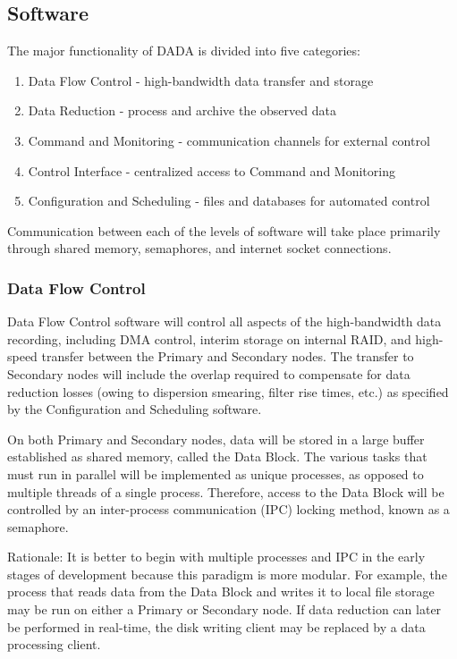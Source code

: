 \subsection{Software}

The major functionality of DADA is divided into five categories:

\begin{enumerate}

\item Data Flow Control - high-bandwidth data transfer and storage
\item Data Reduction - process and archive the observed data
\item Command and Monitoring - communication channels for external control
\item Control Interface - centralized access to Command and Monitoring
\item Configuration and Scheduling - files and databases for automated control

\end{enumerate}

Communication between each of the levels of software will take place
primarily through shared memory, semaphores, and internet socket
connections.

\subsubsection{Data Flow Control}

Data Flow Control software will control all aspects of the
high-bandwidth data recording, including DMA control, interim storage
on internal RAID, and high-speed transfer between the Primary and
Secondary nodes.  The transfer to Secondary nodes will include the
overlap required to compensate for data reduction losses (owing to
dispersion smearing, filter rise times, etc.) as specified by the
Configuration and Scheduling software.

On both Primary and Secondary nodes, data will be stored in a large
buffer established as shared memory, called the Data Block.  The
various tasks that must run in parallel will be implemented as unique
processes, as opposed to multiple threads of a single process.
Therefore, access to the Data Block will be controlled by an
inter-process communication (IPC) locking method, known as a
semaphore.

Rationale: It is better to begin with multiple processes and IPC in the
early stages of development because this paradigm is more modular.
For example, the process that reads data from the Data Block and
writes it to local file storage may be run on either a Primary or
Secondary node.  If data reduction can later be performed in
real-time, the disk writing client may be replaced by a data
processing client.

